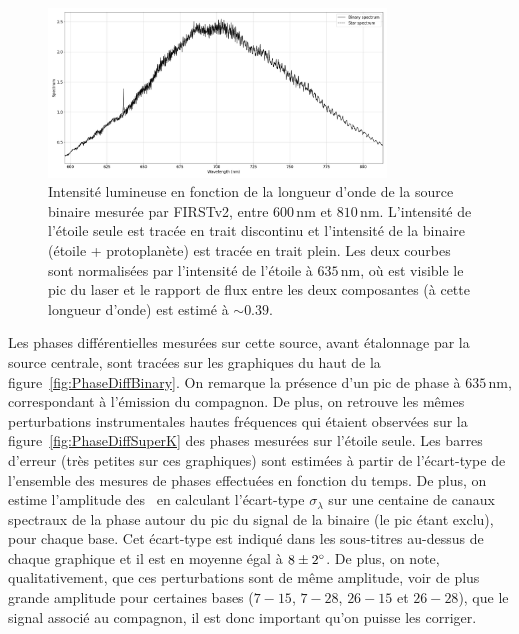 \begin{figure}[ht!]
    \centering
    \includegraphics[width=0.8\textwidth]{Figure_Chap4/20221010_Bin01_Spectra_superK_laser635_Pola1_LaTex.png}
    \caption[Intensité lumineuse en fonction de la longueur d'onde de la source binaire mesurée par FIRSTv2.]{Intensité lumineuse en fonction de la longueur d'onde de la source binaire mesurée par FIRSTv2, entre $600 \,$nm et $810 \,$nm. L'intensité de l'étoile seule est tracée en trait discontinu et l'intensité de la binaire (étoile + protoplanète) est tracée en trait plein. Les deux courbes sont normalisées par l'intensité de l'étoile à $635 \,$nm, où est visible le pic du laser et le rapport de flux entre les deux composantes (à cette longueur d'onde) est estimé à $\sim 0.39$.}
    \label{fig:BinarySpectrum}
\end{figure}

Les phases différentielles mesurées sur cette source, avant étalonnage par la source centrale, sont tracées sur les graphiques du haut de la figure~\ref{fig:PhaseDiffBinary}. On remarque la présence d'un pic de phase à $635 \,$nm, correspondant à l'émission du compagnon. De plus, on retrouve les mêmes perturbations instrumentales hautes fréquences qui étaient observées sur la figure~\ref{fig:PhaseDiffSuperK} des phases mesurées sur l'étoile seule. Les barres d'erreur (très petites sur ces graphiques) sont estimées à partir de l'écart-type de l'ensemble des mesures de phases effectuées en fonction du temps. De plus, on estime l'amplitude des \wiggles~en calculant l'écart-type $\sigma_{\lambda}$ sur une centaine de canaux spectraux de la phase autour du pic du signal de la binaire (le pic étant exclu), pour chaque base. Cet écart-type est indiqué dans les sous-titres au-dessus de chaque graphique et il est en moyenne égal à $8 \pm 2^{\circ}$. De plus, on note, qualitativement, que ces perturbations sont de même amplitude, voir de plus grande amplitude pour certaines bases ($7-15$, $7-28$, $26-15$ et $26-28$), que le signal associé au compagnon, il est donc important qu'on puisse les corriger.

